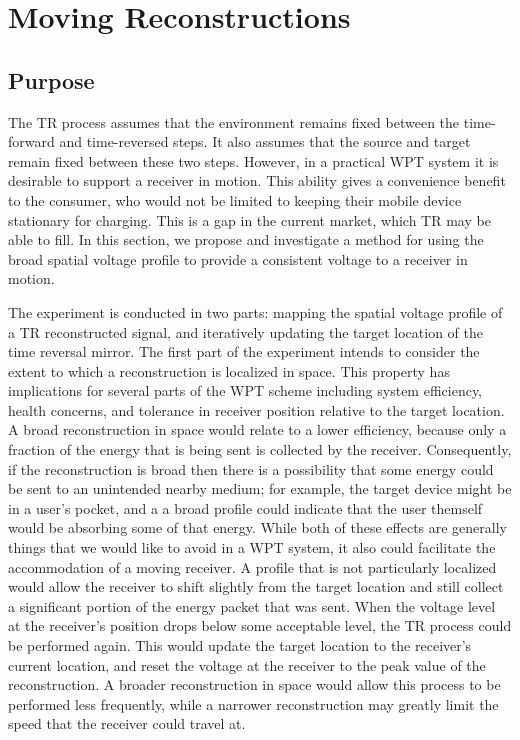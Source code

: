 \section{Moving Reconstructions}
\label{sec:moving}

\subsection{Purpose}
The TR process assumes that the environment remains fixed between the time-forward and time-reversed steps. It also assumes that the source and target remain fixed between these two steps. However, in a practical WPT system it is desirable to support a receiver in motion. This ability gives a convenience benefit to the consumer, who would not be limited to keeping their mobile device stationary for charging. This is a gap in the current market, which TR may be able to fill. In this section, we propose and investigate a method for using the broad spatial voltage profile to provide a consistent voltage to a receiver in motion.

The experiment is conducted in two parts: mapping the spatial voltage profile of a TR reconstructed signal, and iteratively updating the target location of the time reversal mirror. The first part of the experiment intends to consider the extent to which a reconstruction is localized in space. This property has implications for several parts of the WPT scheme including system efficiency, health concerns, and tolerance in receiver position relative to the target location. A broad reconstruction in space would relate to a lower efficiency, because only a fraction of the energy that is being sent is collected by the receiver. Consequently, if the reconstruction is broad then there is a possibility that some energy could be sent to an unintended nearby medium; for example, the target device might be in a user's pocket, and a a broad profile could indicate that the user themself would be absorbing some of that energy. While both of these effects are generally things that we would like to avoid in a WPT system, it also could facilitate the accommodation of a moving receiver. A profile that is not particularly localized would allow the receiver to shift slightly from the target location and still collect a significant portion of the energy packet that was sent. When the voltage level at the receiver's position drops below some acceptable level, the TR process could be performed again. This would update the target location to the receiver's current location, and reset the voltage at the receiver to the peak value of the reconstruction. A broader reconstruction in space would allow this process to be performed less frequently, while a narrower reconstruction may greatly limit the speed that the receiver could travel at.

